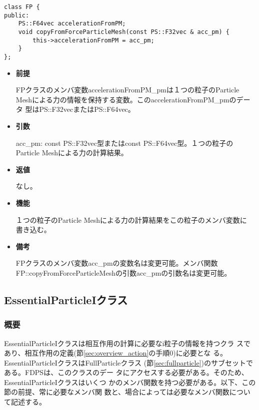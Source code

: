 
\begin{screen}
\begin{verbatim}
class FP {
public:
    PS::F64vec accelerationFromPM;
    void copyFromForceParticleMesh(const PS::F32vec & acc_pm) {
        this->accelerationFromPM = acc_pm;
    }
};
\end{verbatim}
\end{screen}

\begin{itemize}

\item {\bf 前提}

  FPクラスのメンバ変数accelerationFromPM\_pmは１つの粒子のParticle
  Meshによる力の情報を保持する変数。このaccelerationFromPM\_pmのデータ
  型はPS::F32vecまたはPS::F64vec。

\item {\bf 引数}

  acc\_pm: const PS::F32vec型またはconst PS::F64vec型。１つの粒子の
  Particle Meshによる力の計算結果。

\item {\bf 返値}

  なし。
  
\item {\bf 機能}

  １つの粒子のParticle Meshによる力の計算結果をこの粒子のメンバ変数に
  書き込む。
  
\item {\bf 備考}

  FPクラスのメンバ変数acc\_pmの変数名は変更可能。メンバ関数
  FP::copyFromForceParticleMeshの引数acc\_pmの引数名は変更可能。

\end{itemize}

\subsection{EssentialParticleIクラス}
\label{sec:example_essentialparticlei}

\subsubsection{概要}

EssentialParticleIクラスは相互作用の計算に必要なi粒子の情報を持つクラ
スであり、相互作用の定義(節\ref{sec:overview_action}の手順0)に必要とな
る。EssentialParticleIクラスはFullParticleクラス
(節\ref{sec:fullparticle})のサブセットである。FDPSは、このクラスのデー
タにアクセスする必要がある。そのため、EssentialParticleIクラスはいくつ
かのメンバ関数を持つ必要がある。以下、この節の前提、常に必要なメンバ関
数と、場合によっては必要なメンバ関数について記述する。

